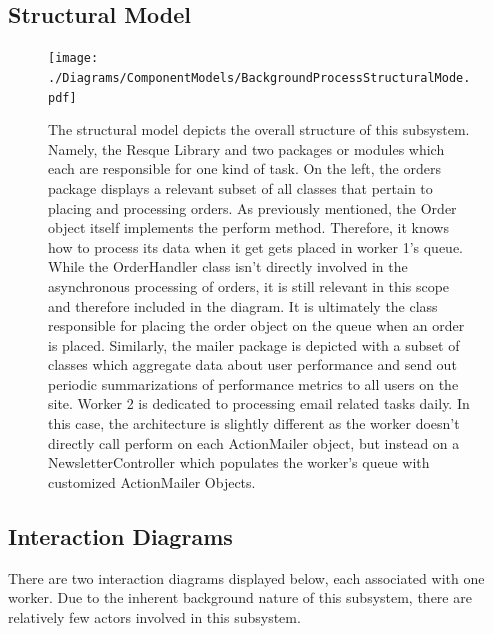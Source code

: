 \subsection{Structural Model}

\begin{figure}
\centering
\texttt{[image: ./Diagrams/ComponentModels/BackgroundProcessStructuralMode.pdf]}
\caption{The structural model depicts the overall structure of this subsystem. Namely, the Resque Library and two packages or modules which each are responsible for one kind of task. On the left, the orders package displays a relevant subset of all classes that pertain to placing and processing orders. As previously mentioned, the Order object itself implements the perform method. Therefore, it knows how to process its data when it get gets placed in worker 1's queue. While the OrderHandler class isn't directly involved in the asynchronous processing of orders, it is still relevant in this scope and therefore included in the diagram. It is ultimately the class responsible for placing the order object on the queue when an order is placed. Similarly, the mailer package is depicted with a subset of classes which aggregate data about user performance and send out periodic summarizations of performance metrics to all users on the site. Worker 2 is dedicated to processing email related tasks daily. In this case, the architecture is slightly different as the worker doesn't directly call perform on each ActionMailer object, but instead on a NewsletterController which populates the worker's queue with customized ActionMailer Objects.}
\end{figure}

\subsection{Interaction Diagrams}

There are two interaction diagrams displayed below, each associated with one worker. Due to the inherent background nature of this subsystem, there are relatively few actors involved in this subsystem.\\

